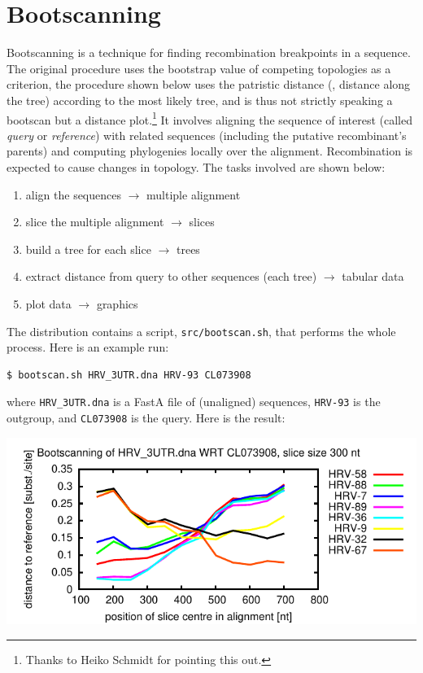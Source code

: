 \section{Bootscanning}
\label{sct_bootscanning}

Bootscanning is a technique for finding recombination breakpoints in a
sequence. The original procedure \cite{Salminen_1995} uses the bootstrap value
of competing topologies as a criterion, the procedure shown below uses the
patristic distance (\ie, distance along the tree) according to the most likely
tree, and is thus not strictly speaking a bootscan but a distance
plot.\footnote{Thanks to Heiko Schmidt for pointing this out.} It involves
aligning the sequence of interest (called \emph{query} or \emph{reference})
with related sequences (including the putative recombinant's parents) and
computing phylogenies locally over the alignment.  Recombination is expected to
cause changes in topology.  The tasks involved are shown below:
\begin{enumerate}
\item align the sequences $\rightarrow$ multiple alignment
\item slice the multiple alignment $\rightarrow$ slices
\item build a tree for each slice $\rightarrow$ trees
\item extract distance from query to other sequences (each tree) $\rightarrow$ tabular data
\item plot data $\rightarrow$ graphics
\end{enumerate}
The distribution contains a script, \texttt{src/bootscan.sh}, that performs the whole process. Here is an example run:
\begin{verbatim}
$ bootscan.sh HRV_3UTR.dna HRV-93 CL073908
\end{verbatim}
where \texttt{HRV\_3UTR.dna} is a FastA file of (unaligned) sequences, \texttt{HRV-93} is the outgroup, and \texttt{CL073908} is the query.  Here is the result:

\begin{centering}
\includegraphics[width=\textwidth]{bootscan_1.pdf}
\end{centering}

